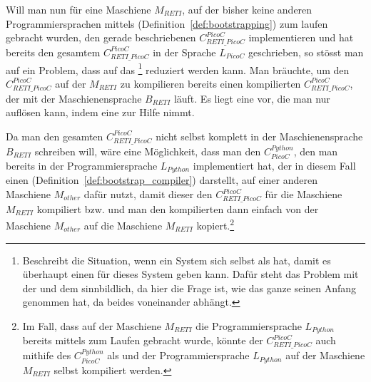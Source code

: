 Will man nun für eine Maschiene $M_{RETI}$, auf der bisher keine anderen Programmiersprachen mittels  (Definition~\ref{def:bootstrapping}) zum laufen gebracht wurden, den gerade beschriebenen  $C_{RETI\_PicoC}^{PicoC}$ implementieren und hat bereits den gesamtem  $C_{RETI\_PicoC}^{PicoC}$ in der Sprache  $L_{PicoC}$ geschrieben, so stösst man auf ein Problem, dass auf das \footnote{Beschreibt die Situation, wenn ein System sich selbst als  hat, damit es überhaupt einen  für dieses System geben kann. Dafür steht das Problem mit der  und dem  sinnbildlich, da hier die Frage ist, wie das ganze seinen Anfang genommen hat, da beides  voneinander abhängt.} reduziert werden kann. Man bräuchte, um den  $C_{RETI\_PicoC}^{PicoC}$ auf der  $M_{RETI}$ zu kompilieren bereits einen kompilierten  $C_{RETI\_PicoC}^{PicoC}$, der mit der Maschienensprache $B_{RETI}$ läuft. Es liegt eine  vor, die man nur auflösen kann, indem eine  zur Hilfe nimmt.

Da man den gesamten  $C_{RETI\_PicoC}^{PicoC}$ nicht selbst komplett in der Maschienensprache $B_{RETI}$ schreiben will, wäre eine Möglichkeit, dass man den  $C_{PicoC}^{Python}$, den man bereits in der Programmiersprache $L_{Python}$ implementiert hat, der in diesem Fall einen  (Definition~\ref{def:bootstrap_compiler}) darstellt, auf einer anderen Maschiene $M_{other}$ dafür nutzt, damit dieser den  $C_{RETI\_PicoC}^{PicoC}$ für die Maschiene $M_{RETI}$ kompiliert bzw.  und man den kompilierten  dann einfach von der Maschiene $M_{other}$ auf die Maschiene $M_{RETI}$ kopiert.\footnote{Im Fall, dass auf der Maschiene $M_{RETI}$ die Programmiersprache $L_{Python}$ bereits mittels  zum Laufen gebracht wurde, könnte der  $C_{RETI\_PicoC}^{PicoC}$ auch mithife des  $C_{PicoC}^{Python}$ als  und der Programmiersprache $L_{Python}$ auf der Maschiene $M_{RETI}$ selbst kompiliert werden.}

